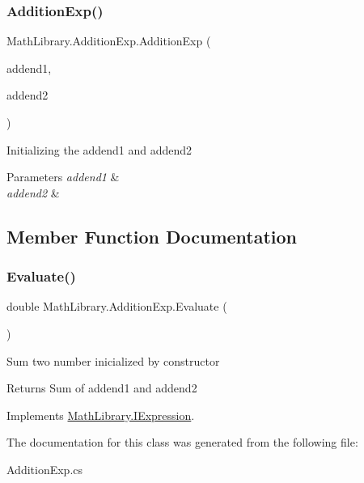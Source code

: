 \subsubsection{\texorpdfstring{AdditionExp()}{AdditionExp()}}
{\footnotesize\ttfamily Math\+Library.\+Addition\+Exp.\+Addition\+Exp (\begin{DoxyParamCaption}\item[{\mbox{\hyperlink{interface_math_library_1_1_i_expression}{I\+Expression}}}]{addend1,  }\item[{\mbox{\hyperlink{interface_math_library_1_1_i_expression}{I\+Expression}}}]{addend2 }\end{DoxyParamCaption})\hspace{0.3cm}{\ttfamily [inline]}}



Initializing the addend1 and addend2 


\begin{DoxyParams}{Parameters}
{\em addend1} & \\
\hline
{\em addend2} & \\
\hline
\end{DoxyParams}


\subsection{Member Function Documentation}
\mbox{\label{class_math_library_1_1_addition_exp_ad3603c036ab0ce56f55f6a76c9566246}} 
\subsubsection{\texorpdfstring{Evaluate()}{Evaluate()}}
{\footnotesize\ttfamily double Math\+Library.\+Addition\+Exp.\+Evaluate (\begin{DoxyParamCaption}{ }\end{DoxyParamCaption})\hspace{0.3cm}{\ttfamily [inline]}}



Sum two number inicialized by constructor 

\begin{DoxyReturn}{Returns}
Sum of addend1 and addend2
\end{DoxyReturn}


Implements \mbox{\hyperlink{interface_math_library_1_1_i_expression}{Math\+Library.\+I\+Expression}}.



The documentation for this class was generated from the following file\+:\begin{DoxyCompactItemize}
\item 
Addition\+Exp.\+cs\end{DoxyCompactItemize}
